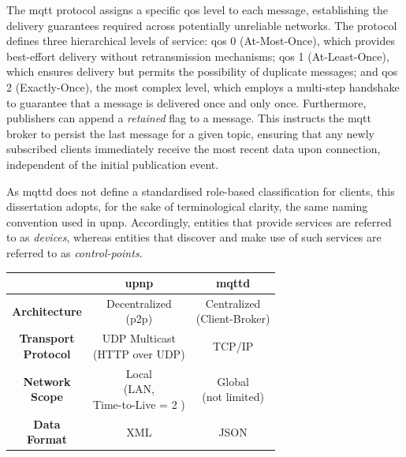\documentclass[lettersize,journal]{IEEEtran}
\begin{document}
The \gls{mqtt} protocol assigns a specific \gls{qos} level to each message, establishing the delivery guarantees required across potentially unreliable networks. The protocol defines three hierarchical levels of service: \gls{qos} 0 (At-Most-Once), which provides best-effort delivery without retransmission mechanisms; \gls{qos} 1 (At-Least-Once), which ensures delivery but permits the possibility of duplicate messages; and \gls{qos} 2 (Exactly-Once), the most complex level, which employs a multi-step handshake to guarantee that a message is delivered once and only once. Furthermore, publishers can append a \textit{retained} flag to a message. This instructs the \gls{mqtt} broker to persist the last message for a given topic, ensuring that any newly subscribed clients immediately receive the most recent data upon connection, independent of the initial publication event.

As \gls{mqttd} does not define a standardised role-based classification for clients, this dissertation adopts, for the sake of terminological clarity, the same naming convention used in \gls{upnp}. Accordingly, entities that provide services are referred to as \textit{devices}, whereas entities that discover and make use of such services are referred to as \textit{control-points}.

\vspace{1em}

\begin{tabular}{c|c|c}
    \centering
    & \textbf{\gls{upnp}} & \textbf{\gls{mqttd}} \\ 
    \hline
    \textbf{Architecture} & \makecell{Decentralized \\ (\gls{p2p})} & \makecell{Centralized \\ (Client-Broker)} \\
    \hline
    \makecell{\textbf{Transport} \\ \textbf{Protocol}} & \makecell{UDP Multicast \\ (HTTP over UDP)} & TCP/IP \\
    \hline
    \makecell{\textbf{Network} \\ \textbf{Scope}} & \makecell{Local \\ (LAN,  \\ Time-to-Live = 2 \cite{ocf_upnp_architecture_2020})} & \makecell{Global \\ (not limited)} \\
    \hline
    \makecell{\textbf{Data} \\ \textbf{Format}} & XML & JSON \\
    
\end{tabular}
\end{document}
